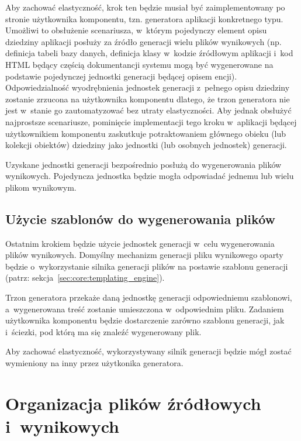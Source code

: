 Aby zachować elastyczność, krok ten będzie musiał być zaimplementowany po stronie użytkownika komponentu, tzn. generatora aplikacji konkretnego typu.
Umożliwi to obsłużenie scenariusza, w~którym pojedynczy element opisu dziedziny aplikacji posłuży za źródło generacji wielu plików wynikowych (np. definicja tabeli bazy danych, definicja klasy w~kodzie źródłowym aplikacji i~kod HTML będący częścią dokumentancji systemu mogą być wygenerowane na podstawie pojedynczej jednostki generacji będącej opisem encji).
Odpowiedzialność wyodrębnienia jednostek generacji z~pełnego opisu dziedziny zostanie zrzucona na użytkownika komponentu dlatego, że trzon generatora nie jest w~stanie go zautomatyzować bez utraty elastyczności.
Aby jednak obsłużyć najprostsze scenariusze, pominięcie implementacji tego kroku w~aplikacji będącej użytkownikiem komponentu zaskutkuje potraktowaniem głównego obieku (lub kolekcji obiektów) dziedziny jako jednostki (lub osobnych jednostek) generacji.

Uzyskane jednostki generacji bezpośrednio posłużą do wygenerowania plików wynikowych. Pojedyncza jednostka będzie mogła odpowiadać jednemu lub wielu plikom wynikowym.


\subsection{Użycie szablonów do wygenerowania plików}

Ostatnim krokiem będzie użycie jednostek generacji w~celu wygenerowania plików wynikowych.
Domyślny mechanizm generacji pliku wynikowego oparty będzie o~wykorzystanie silnika generacji plików na postawie szablonu generacji (patrz: sekcja~\ref{sec:core:templating_engine}).

Trzon generatora przekaże daną jednostkę generacji odpowiedniemu szablonowi, a~wygenerowana treść zostanie umieszczona w~odpowiednim pliku.
Zadaniem użytkownika komponentu będzie dostarczenie zarówno szablonu generacji, jak i~ściezki, pod którą ma się znaleźć wygenerowany plik.

Aby zachować elastyczność, wykorzystywany silnik generacji będzie mógł zostać wymieniony na inny przez użytkonika generatora.



\section{Organizacja plików źródłowych i~wynikowych} \label{sec:core:files_structure}

